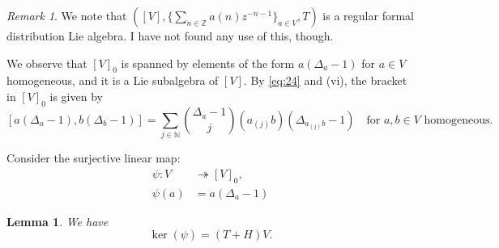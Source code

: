 \documentclass[a4paper, 12pt, reqno]{amsart}
\newtheorem{lemma}[theorem]{Lemma}
\theoremstyle{remark}
\newtheorem{remark}[theorem]{Remark}
\numberwithin{equation}{subsection}
\begin{document}
\begin{remark}
  \label{rmk:25}
  We note that $([V], \{\sum_{n \in \mathbb{Z}}a(n)z^{-n - 1}\}_{a \in V}, T)$ is a regular formal distribution Lie algebra.
  I have not found any use of this, though.
\end{remark}

We observe that $[V]_0$ is spanned by elements of the form $a(\Delta_a - 1)$ for $a \in V$ homogeneous, and it is a Lie subalgebra of $[V]$.
By \eqref{eq:24} and (vi), the bracket in $[V]_0$ is given by
\begin{equation}
  \label{eq:26}
  [a(\Delta_a - 1), b(\Delta_b - 1)] = \sum_{j \in \mathbb{N}}\binom{\Delta_a - 1}{j}(a_{(j)}b)(\Delta_{a_{(j)}b} - 1) \quad \text{for }a, b \in V\text{ homogeneous}.
\end{equation}

Consider the surjective linear map:
\begin{align*}
  \psi: V &\twoheadrightarrow [V]_0, \\
  \psi(a) &= a(\Delta_a - 1)
\end{align*}

\begin{lemma}
  \label{lmm:15}
  We have
  \begin{equation*}
    \ker(\psi) = (T + H)V.
  \end{equation*}
\end{lemma}
\end{document}
